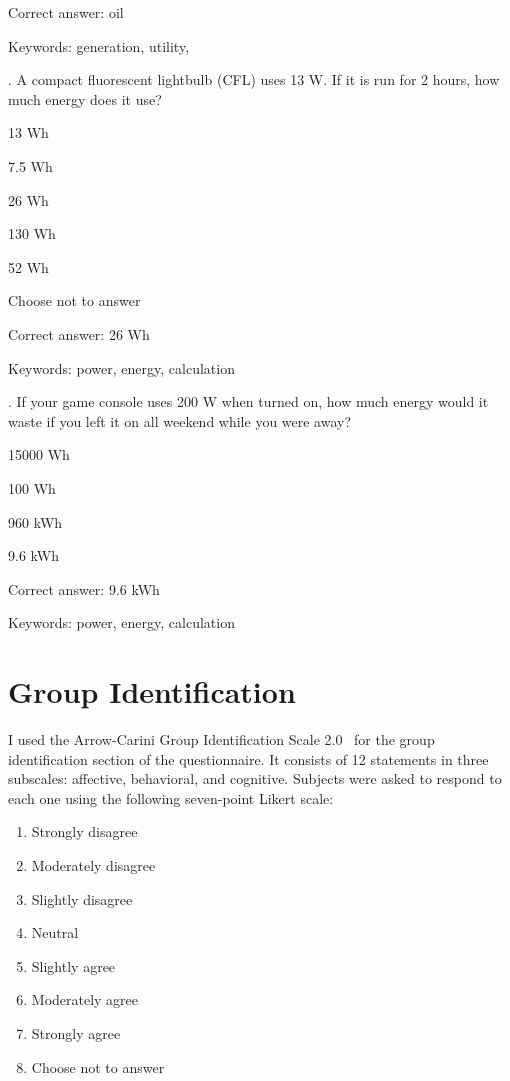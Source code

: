 Correct answer: oil

Keywords: generation, utility, \Hawaii

\vspace{5 mm}
. A compact fluorescent lightbulb (CFL) uses 13 W. If it is run for 2 hours, how much energy does it use?

\begin{answer}
	\item 13 Wh
	\item 7.5 Wh
	\item 26 Wh
	\item 130 Wh
	\item 52 Wh
	\item Choose not to answer
\end{answer}

Correct answer: 26 Wh

Keywords: power, energy, calculation

\vspace{5 mm}
. If your game console uses 200 W when turned on, how much energy would it waste if you left it on all weekend while you were away?

\begin{answer}
	\item 15000 Wh
	\item 100 Wh
	\item 960 kWh
	\item 9.6 kWh
\end{answer}

Correct answer: 9.6 kWh

Keywords: power, energy, calculation


\section{Group Identification}
\label{group-id-items}

I used the Arrow-Carini Group Identification Scale 2.0~\cite{Henry1999} for the group identification section of the questionnaire. It consists of 12 statements in three subscales: affective, behavioral, and cognitive. Subjects were asked to respond to each one using the following seven-point Likert scale:

\begin{enumerate}
	\item Strongly disagree
	\item Moderately disagree
	\item Slightly disagree
	\item Neutral
	\item Slightly agree
	\item Moderately agree
	\item Strongly agree
	\item Choose not to answer
\end{enumerate}


